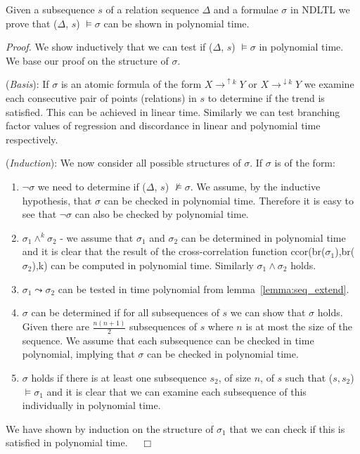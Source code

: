 \begin{theorem}\label{theorem:pt_logic}
\begin{rm}
Given a subsequence $s$ of a relation sequence $\Delta$ and a formulae $\sigma$ in NDLTL
we prove that ($\Delta$, $s$) $\models \sigma$ can be shown in
 polynomial time.
\end{rm}
\end{theorem}

\smallskip

{\em Proof.} We show inductively that we can test if  
($\Delta$, $s$) $\models \sigma$ in
polynomial time. We base our proof on the structure of $\sigma$.

\smallskip
({\em Basis}): If $\sigma$ is an atomic formula of the form $X
\to^{\uparrow{k}} Y$ or  $X \to^{\downarrow{k}} Y$ we
examine each consecutive pair of points (relations) in $s$ to determine if the trend
is satisfied. This can be achieved in linear time. Similarly we can
test branching factor values of regression and discordance in linear
and polynomial time respectively.

\smallskip
({\em Induction}): We now consider all possible structures of
$\sigma$. If $\sigma$ is of the form:
\begin{enumerate}
\item $\neg \sigma$  we need to determine if ($\Delta$, $s$)
$\not\models \sigma$. We assume, by the inductive hypothesis, that
$\sigma$ can be checked in polynomial time. Therefore it is easy to
see that $\neg \sigma$ can also be checked by polynomial time.
\item $\sigma_1 \wedge^k \sigma_2$ - we assume that $\sigma_1$ and
$\sigma_2$ can be determined in polynomial time and it is clear that
the result of the cross-correlation function
ccor(br($\sigma_1$),br($\sigma_2$),k) can be computed in polynomial
time. Similarly $\sigma_1 \wedge \sigma_2$ holds.
\item $\sigma_1 \leadsto \sigma_2$ can be tested in time polynomial
from lemma~\ref{lemma:seq_extend}.  
\item {} $\sigma$ can be determined if for all subsequences of $s$
we can show that $\sigma$ holds.  Given  there
are $\frac{n(n+1)}{2}$ subsequences of $s$ where $n$ is at most the
size of the sequence. We assume that each
subsequence can be checked in time polynomial, implying that 
$\sigma$ can be checked in polynomial time.
\item {} $\sigma$ holds if there is at least one subsequence
$s_2$, of size $n$,
of $s$ such that ($s, s_2$) $\models \sigma_1$ and it is clear
that we can examine each subsequence of this individually in
polynomial time.
\end{enumerate}
We have shown by induction on the structure of $\sigma_1$ that we can
check if this is satisfied in polynomial time. $\quad\Box$
 

